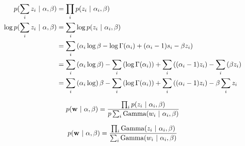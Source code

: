 \documentclass[11pt,letterpaper]{article}
\begin{document}
\begin{align}
p(\sum_i z_i ~\vert~ \mathbf{\alpha}, \beta) &= \prod_i p(z_i ~\vert~ \alpha_i, \beta) \\
\log p(\sum_i z_i ~\vert~ \mathbf{\alpha}, \beta) &= \sum_i \log p(z_i ~\vert~ \alpha_i, \beta) \\
&= \sum_i \left(\alpha_i \log \beta - \log \Gamma(\alpha_i) + (\alpha_i - 1) s_i - \beta z_i \right)\\
&= \sum_i \left(\alpha_i \log \beta\right) - \sum_i \left( \log \Gamma(\alpha_i)\right) + \sum_i \left((\alpha_i - 1) z_i\right) - \sum_i \left(\beta z_i\right) \\
&= \sum_i \left(\alpha_i \log\right) \beta - \sum_i \left( \log \Gamma(\alpha_i)\right) + \sum_i \left((\alpha_i - 1) z_i\right) - \beta \sum_i z_i \\
\end{align}

\begin{equation}
p(\mathbf{w} ~\vert~ \mathbf{\alpha}, \beta) = \frac{\prod_i p(z_i ~\vert~ \alpha_i, \beta)}{p\sum_i \mbox{Gamma}(w_i ~\vert~ \alpha_i, \beta)}
\end{equation}

\begin{equation}
p(\mathbf{w} ~\vert~ \mathbf{\alpha}, \beta) = \frac{\prod_i\mbox{Gamma}(z_i ~\vert~ \alpha_i, \beta)}{\sum_i \mbox{Gamma}(w_i ~\vert~ \alpha_i, \beta)}
\end{equation}


%
%
\end{document}
